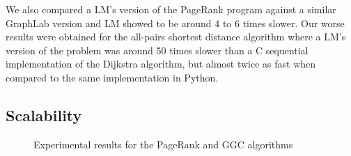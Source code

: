 \documentclass{sigplanconf}
\begin{document}
We also compared a LM's version of the PageRank program against a
similar GraphLab version and LM showed to be around 4 to 6 times
slower. Our worse results were obtained for the all-pairs shortest
distance algorithm where a LM's version of the problem was around 50
times slower than a C sequential implementation of the Dijkstra
algorithm, but almost twice as fast when compared to the same
implementation in Python.


\subsection{Scalability}

\begin{figure}[ht]
\centering
{}
\hspace{0.5cm}
\caption{Experimental results for the PageRank and GGC  algorithms}
\end{figure}
\end{document}
